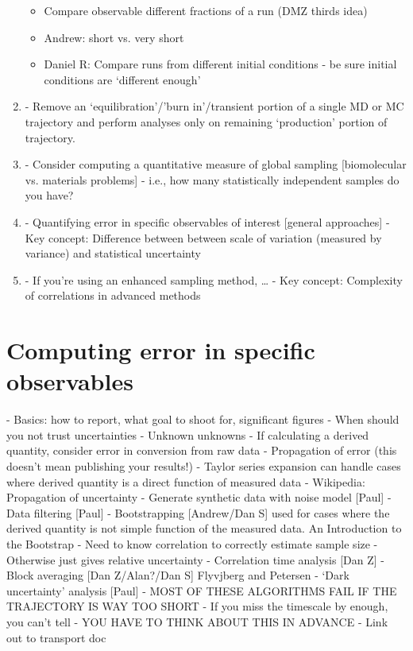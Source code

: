 \documentclass[9pt]{livecoms}
\begin{document}
\begin{enumerate}
\begin{itemize}
    \item Compare observable different fractions of a run (DMZ thirds idea)
    \item Andrew: short vs. very short
    \item Daniel R: Compare runs from different initial conditions - be sure initial conditions are ‘different enough’
    \end{itemize}    
\item
- Remove an ‘equilibration’/’burn in’/transient portion of a single MD or MC trajectory and perform analyses only on remaining ‘production’ portion of trajectory.
\item
- Consider computing a quantitative measure of global sampling [biomolecular vs. materials problems] - i.e., how many statistically independent samples do you have?
\item
- Quantifying error in specific observables of interest [general approaches]
    - Key concept: Difference between between scale of variation (measured by variance) and statistical uncertainty
\item
- If you’re using an enhanced sampling method, …
    - Key concept: Complexity of correlations in advanced methods
\end{enumerate}

\section{Computing error in specific observables}
- Basics: how to report, what goal to shoot for, significant figures
- When should you not trust uncertainties
    - Unknown unknowns
- If calculating a derived quantity, consider error in conversion from raw data 
    - Propagation of error (this doesn’t mean publishing your results!)
    - Taylor series expansion can handle cases where derived quantity is a direct function of measured data
    - Wikipedia: Propagation of uncertainty
    - Generate synthetic data with noise model [Paul]
    - Data filtering [Paul]
    - Bootstrapping [Andrew/Dan S]
used for cases where the derived quantity is not simple function of the measured data.
An Introduction to the Bootstrap
    - Need to know correlation to correctly estimate sample size
    - Otherwise just gives relative uncertainty
- Correlation time analysis [Dan Z]
- Block averaging [Dan Z/Alan?/Dan S] Flyvjberg and Petersen 
- ‘Dark uncertainty’ analysis [Paul]
- MOST OF THESE ALGORITHMS FAIL IF THE TRAJECTORY IS WAY TOO SHORT
    - If you miss the timescale by enough, you can’t tell
    - YOU HAVE TO THINK ABOUT THIS IN ADVANCE
- Link out to transport doc
\end{document}
